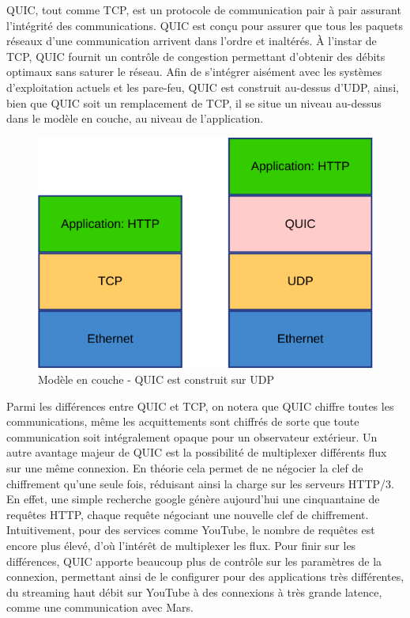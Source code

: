 QUIC, tout comme TCP, est un protocole de communication pair à pair assurant l'intégrité des communications.
QUIC est conçu pour assurer que tous les paquets réseaux d'une communication arrivent dans l'ordre et inaltérés.
À l'instar de TCP, QUIC fournit un contrôle de congestion permettant d'obtenir des débits optimaux sans saturer le réseau.
Afin de s'intégrer aisément avec les systèmes d'exploitation actuels et les pare-feu, QUIC est construit au-dessus d'UDP, ainsi, bien que QUIC soit un remplacement de TCP, il se situe un niveau au-dessus dans le modèle en couche, au niveau de l'application.

\begin{figure}[H]
    \centering
    \includegraphics[height=0.20\textheight]{figures/network_layers.png}
    \caption{Modèle en couche - QUIC est construit sur UDP}
\end{figure}

Parmi les différences entre QUIC et TCP, on notera que QUIC chiffre toutes les communications, même les acquittements sont chiffrés de sorte que toute communication soit intégralement opaque pour un observateur extérieur. Un autre avantage majeur de QUIC est la possibilité de multiplexer différents flux sur une même connexion. En théorie cela permet de ne négocier la clef de chiffrement qu'une seule fois, réduisant ainsi la charge sur les serveurs HTTP/3. En effet, une simple recherche google génère aujourd'hui une cinquantaine de requêtes HTTP, chaque requête négociant une nouvelle clef de chiffrement. Intuitivement, pour des services comme YouTube, le nombre de requêtes est encore plus élevé, d'où l'intérêt de multiplexer les flux.
Pour finir sur les différences, QUIC apporte beaucoup plus de contrôle sur les paramètres de la connexion, permettant ainsi de le configurer pour des applications très différentes, du streaming haut débit sur YouTube à des connexions à très grande latence, comme une communication avec Mars.

